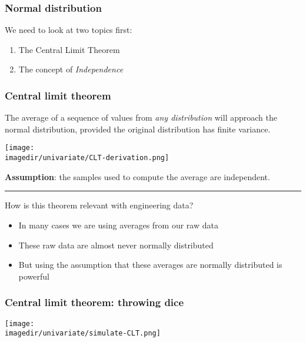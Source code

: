 \begin{frame}\frametitle{Normal distribution}

	We need to look at two topics first:
	\begin{enumerate}
		\item	The Central Limit Theorem
		\item	The concept of \emph{Independence}
	\end{enumerate}
\end{frame}

\begin{frame}\frametitle{Central limit theorem}
	\begin{block}
		{\color{purple}{Central limit theorem}}
		\begin{center}
			The average of a sequence of values from \emph{any distribution} will approach the normal distribution, provided the original distribution has finite variance.
		\end{center}
	\end{block}

	\texttt{[image: \\imagedir/univariate/CLT-derivation.png]}

	\textbf{Assumption}: the samples used to compute the average are independent.
	\vspace{4pt}
	\hrule
	\vspace{4pt}
	How is this theorem relevant with engineering data?
	\begin{itemize}
		\item	In many cases we are using averages from our raw data
		\item	These raw data are almost never normally distributed
		\item	But using the assumption that these averages are normally distributed is powerful
	\end{itemize}
\end{frame}

\begin{frame}\frametitle{Central limit theorem: throwing dice {\color{myGreen}{(independent events)}}}
	\texttt{[image: \\imagedir/univariate/simulate-CLT.png]}
\end{frame}

